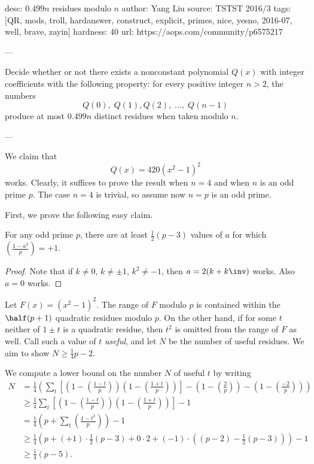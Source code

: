 desc:  $0.499n$ residues modulo $n$
author: Yang Liu
source:  TSTST 2016/3
tags:  [QR, mods, troll, hardanswer, construct, explicit, primes, nice, yesno, 2016-07, well, brave, zayin]
hardness: 40
url: https://aops.com/community/p6575217

---

Decide whether or not there exists a nonconstant polynomial $Q(x)$
with integer coefficients with the following property:
for every positive integer $n > 2$, the numbers
\[ Q(0), \; Q(1), Q(2),  \; \dots, \; Q(n-1) \]
produce at most $0.499n$ distinct residues when taken modulo $n$.

---

We claim that
\[ Q(x) = 420(x^2-1)^2 \]
works.
Clearly, it suffices to prove the result when $n=4$ and when $n$ is an odd prime $p$.
The case $n=4$ is trivial, so assume now $n=p$ is an odd prime.

First, we prove the following easy claim.
\begin{claim*}
  For any odd prime $p$, there are at least $\frac12(p-3)$
  values of $a$ for which $\left( \frac{1-a^2}{p} \right) = +1$.
\end{claim*}
\begin{proof}
  Note that if $k \neq 0$, $k \neq \pm 1$, $k^2 \neq -1$, then $a = 2(k+k\inv)$ works.
  Also $a=0$ works.
\end{proof}

Let $F(x) = (x^2-1)^2$.
The range of $F$ modulo $p$ is contained within the $\half(p+1)$ quadratic residues modulo $p$.
On the other hand, if for some $t$ neither of $1 \pm t$ is a quadratic residue,
then $t^2$ is omitted from the range of $F$ as well.
Call such a value of $t$ \emph{useful}, and let $N$ be the number of useful residues.
We aim to show $N \ge \frac14 p - 2$.

We compute a lower bound on the number $N$ of useful $t$ by writing
\begin{align*}
  N &= \frac{1}{4} \left( \sum_t \left[ \left(1 - \left(\frac{1-t}{p} \right) \right)
    \left(1 - \left(\frac{1+t}{p} \right) \right) \right]
    - \left( 1- \left( \frac2p \right) \right)
    - \left( 1- \left( \frac{-2}p \right) \right)
  \right) \\
  &\ge \frac{1}{4} \sum_t \left[ \left(1 - \left(\frac{1-t}{p} \right) \right)
    \left(1 - \left(\frac{1+t}{p} \right) \right) \right] -1 \\
  &= \frac{1}{4} \left(p + \sum_t \left(\frac{1-t^2}{p} \right) \right) -1 \\
  &\ge \frac14 \left( p + (+1) \cdot \tfrac12(p-3) + 0 \cdot 2
    + (-1) \cdot ( (p-2) - \tfrac12(p-3)) \right) - 1 \\
  &\ge \frac14 \left( p - 5 \right).
\end{align*}

